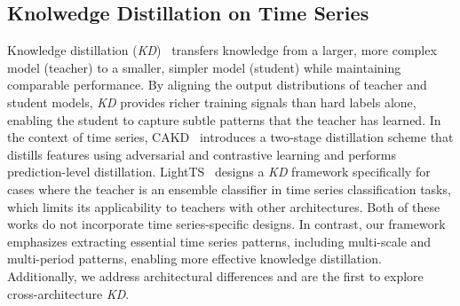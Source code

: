 \subsection{Knolwedge Distillation on Time Series}
Knowledge distillation (\textit{KD})~\cite{hinton2015distilling} transfers knowledge from a larger, more complex model (teacher) to a smaller, simpler model (student) while maintaining comparable performance. By aligning the output distributions of teacher and student models, \textit{KD} provides richer training signals than hard labels alone, enabling the student to capture subtle patterns that the teacher has learned. In the context of time series, CAKD~\cite{xu2022contrastive} introduces a two-stage distillation scheme that distills features using adversarial and contrastive learning and performs prediction-level distillation. LightTS~\cite{campos2023lightts} designs a \textit{KD} framework specifically for cases where the teacher is an ensemble classifier in time series classification tasks, which limits its applicability to teachers with other architectures. Both of these works do not incorporate time series-specific designs. In contrast, our framework emphasizes extracting essential time series patterns, including multi-scale and multi-period patterns, enabling more effective knowledge distillation. Additionally, we address architectural differences and are the first to explore cross-architecture \textit{KD}.